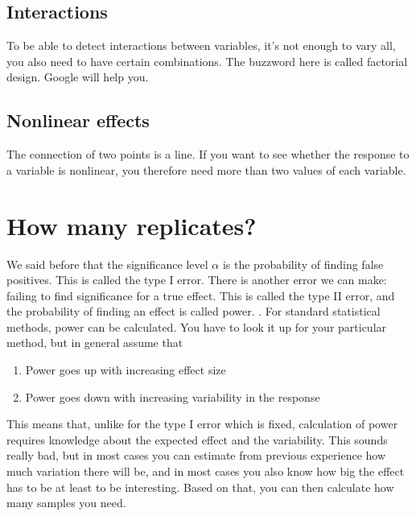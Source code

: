 \documentclass[a4paper,twoside]{tufte-book} %
\begin{document}
\subsection{Interactions}

To be able to detect interactions between variables, it's not enough to vary all, you also need to have certain combinations. The buzzword here is called factorial design. Google will help you.

\subsection{Nonlinear effects}

The connection of two points is a line. If you want to see whether the response to a variable is nonlinear, you therefore need more than two values of each variable.  


\section{How many replicates?}

We said before that the significance level $\alpha$ is the probability of finding false positives. This is called the type I error. There is another error we can make: failing to find significance for a true effect. This is called the type II error, and the probability of finding an effect is called power. . For standard statistical methods, power can be calculated. You have to look it up for your particular method, but in general assume that 

\begin{enumerate}
\item Power goes up with increasing effect size
\item Power goes down with increasing variability in the response
\end{enumerate}

This means that, unlike for the type I error which is fixed, calculation of power requires knowledge about the expected effect and the variability. This sounds really bad, but in most cases you can estimate from previous experience how much variation there will be, and in most cases you also know how big the effect has to be at least to be interesting. Based on that, you can then calculate how many samples you need. \\
\end{document}

